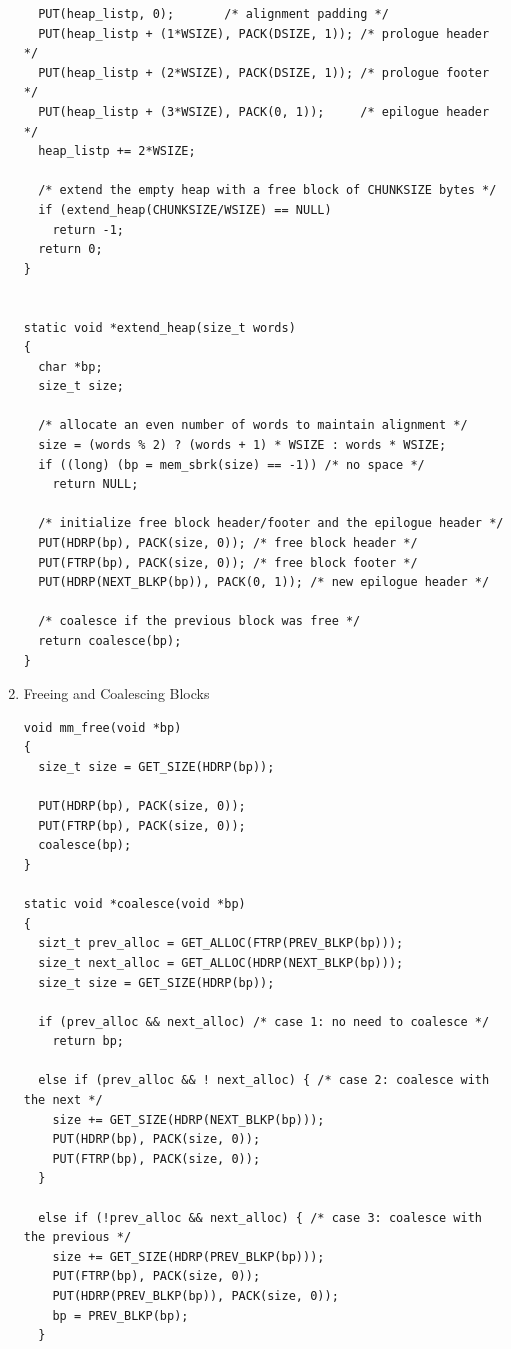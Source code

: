 \documentclass[11pt]{article}
\begin{document}
\begin{enumerate}
\begin{verbatim}
  PUT(heap_listp, 0);		/* alignment padding */
  PUT(heap_listp + (1*WSIZE), PACK(DSIZE, 1)); /* prologue header */
  PUT(heap_listp + (2*WSIZE), PACK(DSIZE, 1)); /* prologue footer */
  PUT(heap_listp + (3*WSIZE), PACK(0, 1));     /* epilogue header */
  heap_listp += 2*WSIZE;

  /* extend the empty heap with a free block of CHUNKSIZE bytes */
  if (extend_heap(CHUNKSIZE/WSIZE) == NULL)
    return -1;
  return 0;
}


static void *extend_heap(size_t words)
{
  char *bp;
  size_t size;

  /* allocate an even number of words to maintain alignment */
  size = (words % 2) ? (words + 1) * WSIZE : words * WSIZE;
  if ((long) (bp = mem_sbrk(size) == -1)) /* no space */
    return NULL;

  /* initialize free block header/footer and the epilogue header */
  PUT(HDRP(bp), PACK(size, 0));	/* free block header */
  PUT(FTRP(bp), PACK(size, 0));	/* free block footer */
  PUT(HDRP(NEXT_BLKP(bp)), PACK(0, 1)); /* new epilogue header */

  /* coalesce if the previous block was free */
  return coalesce(bp);
}

\end{verbatim}


\item Freeing and Coalescing Blocks
\label{sec:org69ad0e2}

\begin{verbatim}
void mm_free(void *bp)
{
  size_t size = GET_SIZE(HDRP(bp));

  PUT(HDRP(bp), PACK(size, 0));
  PUT(FTRP(bp), PACK(size, 0));
  coalesce(bp);
}

static void *coalesce(void *bp)
{
  sizt_t prev_alloc = GET_ALLOC(FTRP(PREV_BLKP(bp)));
  size_t next_alloc = GET_ALLOC(HDRP(NEXT_BLKP(bp)));
  size_t size = GET_SIZE(HDRP(bp));

  if (prev_alloc && next_alloc) /* case 1: no need to coalesce */
    return bp;

  else if (prev_alloc && ! next_alloc) { /* case 2: coalesce with the next */
    size += GET_SIZE(HDRP(NEXT_BLKP(bp)));
    PUT(HDRP(bp), PACK(size, 0));
    PUT(FTRP(bp), PACK(size, 0));
  }

  else if (!prev_alloc && next_alloc) { /* case 3: coalesce with the previous */
    size += GET_SIZE(HDRP(PREV_BLKP(bp)));
    PUT(FTRP(bp), PACK(size, 0));
    PUT(HDRP(PREV_BLKP(bp)), PACK(size, 0));
    bp = PREV_BLKP(bp);
  }


\end{verbatim}
\end{enumerate}
\end{document}
